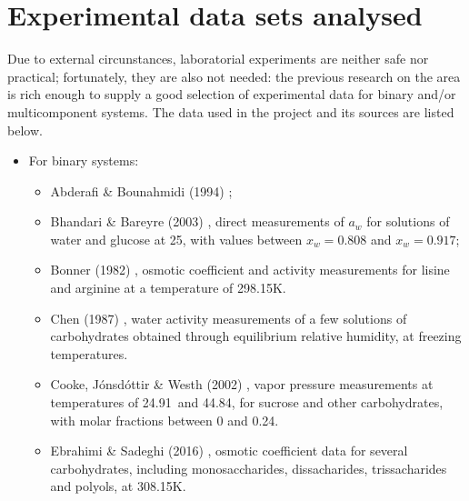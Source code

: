 \documentclass[
	12pt,				%
	openright,
	twoside,
	a4paper,			%
	brazil,			%
	french,				%
	english				%
	]{abntex2}
\begin{document}
\chapter{Experimental data sets analysed}

\label{sec_selec_data}

Due to external circunstances, laboratorial experiments are neither safe nor
practical; fortunately, they are also not needed: the previous research on the
area is rich enough to supply a good selection of experimental data for binary
and/or multicomponent systems. The data used in the project and its sources are
listed below.

\begin{itemize}
	\item For binary systems:
		\begin{itemize}
			\item Abderafi \& Bounahmidi (1994) \cite{abderafi1994};
			\item Bhandari \& Bareyre (2003) \cite{bhandari2003},
				direct measurements of $a_w$ for solutions of water
				and glucose at 25\textcelsius, with values between
				$x_w = 0.808$ and $x_w = 0.917$;
			\item Bonner (1982) \cite{bonner1982}, osmotic coefficient
				and activity measurements for lisine
				and arginine at a temperature of 298.15K.
			\item Chen (1987) \cite{chen1987}, water activity
				measurements of a few solutions of carbohydrates
				obtained through equilibrium relative humidity, at
				freezing temperatures.
			\item Cooke, Jónsdóttir \& Westh (2002) \cite{cooke2002a},
				vapor pressure measurements at temperatures of
				24.91\textcelsius\ and 44.84\textcelsius, for
				sucrose and other carbohydrates, with molar fractions
				between 0 and 0.24.
			\item Ebrahimi \& Sadeghi (2016) \cite{ebrahimi2016},
				osmotic coefficient data for several carbohydrates,
				including monosaccharides, dissacharides,
				trissacharides and polyols, at 308.15K.

\end{itemize}
\end{itemize}
\end{document}
